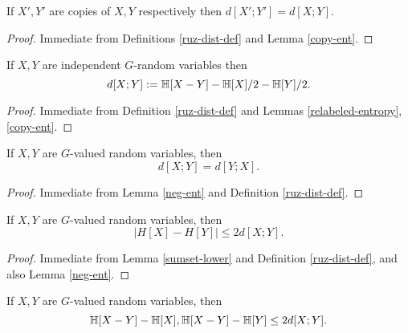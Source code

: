 \begin{lemma}\label{ruz-copy}
  \leanok
  If $X',Y'$ are copies of $X,Y$ respectively then $d[X';Y']=d[X;Y]$.
\end{lemma}

\begin{proof}  Immediate from Definitions \ref{ruz-dist-def} and Lemma \ref{copy-ent}.
\end{proof}

\begin{lemma}\label{ruz-indep}
  \leanok
  If $X,Y$ are independent $G$-random variables then
  $$ d[X;Y] := \mathbb{H}[X - Y] - \mathbb{H}[X]/2 - \mathbb{H}[Y]/2.$$
\end{lemma}

\begin{proof} \leanok Immediate from Definition \ref{ruz-dist-def} and Lemmas \ref{relabeled-entropy}, \ref{copy-ent}.
\end{proof}

\begin{lemma}\label{ruzsa-symm}
  \leanok
  If $X,Y$ are $G$-valued random variables, then
  $$ d[X;Y] = d[Y;X].$$
\end{lemma}

\begin{proof} \leanok Immediate from Lemma \ref{neg-ent} and Definition \ref{ruz-dist-def}.
\end{proof}

\begin{lemma}\label{ruzsa-diff}
  \leanok
  If $X,Y$ are $G$-valued random variables, then
$$|H[X]-H[Y]| \leq 2 d[X;Y].$$
\end{lemma}

\begin{proof}  Immediate from Lemma \ref{sumset-lower} and Definition \ref{ruz-dist-def}, and also Lemma \ref{neg-ent}.
\end{proof}

\begin{lemma}\label{ruzsa-growth}
  If $X,Y$ are $G$-valued random variables, then
$$  \mathbb{H}[X-Y] - \mathbb{H}[X], \mathbb{H}[X-Y] - \mathbb{H}[Y] \leq 2d[X;Y].$$
\end{lemma}

